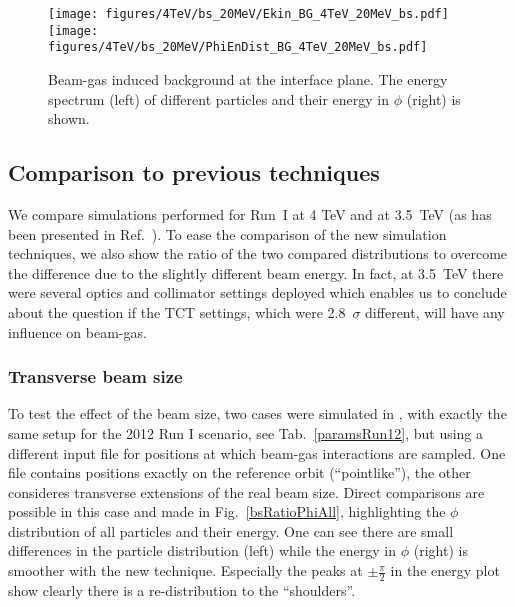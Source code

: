 \begin{figure}%
\centering
\texttt{[image: figures/4TeV/bs\_20MeV/Ekin\_BG\_4TeV\_20MeV\_bs.pdf]}
\texttt{[image: figures/4TeV/bs\_20MeV/PhiEnDist\_BG\_4TeV\_20MeV\_bs.pdf]}
 \caption{Beam-gas induced background at the interface plane. The energy spectrum (left) of different particles and their energy in $\phi$ (right) is shown.
  \label{dist4TeVBGbs}}
\end{figure}
\subsection{Comparison to previous techniques}

We compare simulations performed for Run~I at 4 TeV and at 3.5~TeV (as has been presented in Ref.~\cite{nimPaperRod}). To ease the comparison of the new simulation techniques, we also show the ratio of the two compared distributions to overcome the difference due to the slightly different beam energy. In fact, at 3.5~TeV there were several optics and collimator settings deployed which enables us to conclude about the question if the TCT settings, which were 2.8~$\sigma$ different, will have any influence on beam-gas. 


\subsubsection{Transverse beam size}
To test the effect of the beam size, two cases were simulated in \fluka, with exactly the same setup for the 2012 Run I scenario, see Tab.~\ref{paramsRun12}, but using a different input file for positions at which beam-gas interactions are sampled. One file contains positions exactly on the reference orbit (``pointlike''), the other consideres transverse extensions of the real beam size. Direct comparisons are possible in this case and made in Fig.~\ref{bsRatioPhiAll}, highlighting the $\phi$ distribution of all particles and their energy. One can see there are small differences in the particle distribution (left) while the energy in $\phi$ (right) is smoother with the new technique. Especially the peaks at $\pm \frac{\pi}{2}$ in the energy plot show clearly there is a re-distribution to the ``shoulders''.


